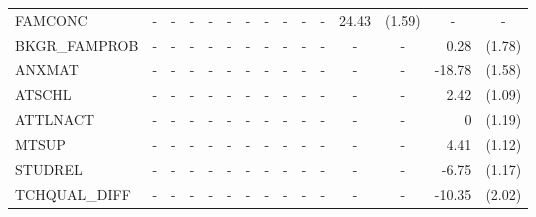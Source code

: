 \documentclass[10pt]{article}
\begin{document}
\begin{table}[htbp]
\begin{tabular}{lrlrlrlrlrlrlrl}
    FAMCONC & \multicolumn{1}{c}{-} & \multicolumn{1}{c}{-} & \multicolumn{1}{c}{-} & \multicolumn{1}{c}{-} & \multicolumn{1}{c}{-} & \multicolumn{1}{c}{-} & \multicolumn{1}{c}{-} & \multicolumn{1}{c}{-} & \multicolumn{1}{c}{-} & \multicolumn{1}{c}{-} & 24.43 & (1.59) & \multicolumn{1}{c}{-} & \multicolumn{1}{c}{-} \\
    BKGR\_FAMPROB & \multicolumn{1}{c}{-} & \multicolumn{1}{c}{-} & \multicolumn{1}{c}{-} & \multicolumn{1}{c}{-} & \multicolumn{1}{c}{-} & \multicolumn{1}{c}{-} & \multicolumn{1}{c}{-} & \multicolumn{1}{c}{-} & \multicolumn{1}{c}{-} & \multicolumn{1}{c}{-} & \multicolumn{1}{c}{-} & \multicolumn{1}{c}{-} & 0.28  & (1.78) \\
    ANXMAT & \multicolumn{1}{c}{-} & \multicolumn{1}{c}{-} & \multicolumn{1}{c}{-} & \multicolumn{1}{c}{-} & \multicolumn{1}{c}{-} & \multicolumn{1}{c}{-} & \multicolumn{1}{c}{-} & \multicolumn{1}{c}{-} & \multicolumn{1}{c}{-} & \multicolumn{1}{c}{-} & \multicolumn{1}{c}{-} & \multicolumn{1}{c}{-} & -18.78 & (1.58) \\
    ATSCHL & \multicolumn{1}{c}{-} & \multicolumn{1}{c}{-} & \multicolumn{1}{c}{-} & \multicolumn{1}{c}{-} & \multicolumn{1}{c}{-} & \multicolumn{1}{c}{-} & \multicolumn{1}{c}{-} & \multicolumn{1}{c}{-} & \multicolumn{1}{c}{-} & \multicolumn{1}{c}{-} & \multicolumn{1}{c}{-} & \multicolumn{1}{c}{-} & 2.42  & (1.09) \\
    ATTLNACT & \multicolumn{1}{c}{-} & \multicolumn{1}{c}{-} & \multicolumn{1}{c}{-} & \multicolumn{1}{c}{-} & \multicolumn{1}{c}{-} & \multicolumn{1}{c}{-} & \multicolumn{1}{c}{-} & \multicolumn{1}{c}{-} & \multicolumn{1}{c}{-} & \multicolumn{1}{c}{-} & \multicolumn{1}{c}{-} & \multicolumn{1}{c}{-} & 0     & (1.19) \\
    MTSUP & \multicolumn{1}{c}{-} & \multicolumn{1}{c}{-} & \multicolumn{1}{c}{-} & \multicolumn{1}{c}{-} & \multicolumn{1}{c}{-} & \multicolumn{1}{c}{-} & \multicolumn{1}{c}{-} & \multicolumn{1}{c}{-} & \multicolumn{1}{c}{-} & \multicolumn{1}{c}{-} & \multicolumn{1}{c}{-} & \multicolumn{1}{c}{-} & 4.41  & (1.12) \\
    STUDREL & \multicolumn{1}{c}{-} & \multicolumn{1}{c}{-} & \multicolumn{1}{c}{-} & \multicolumn{1}{c}{-} & \multicolumn{1}{c}{-} & \multicolumn{1}{c}{-} & \multicolumn{1}{c}{-} & \multicolumn{1}{c}{-} & \multicolumn{1}{c}{-} & \multicolumn{1}{c}{-} & \multicolumn{1}{c}{-} & \multicolumn{1}{c}{-} & -6.75 & (1.17) \\
    TCHQUAL\_DIFF & \multicolumn{1}{c}{-} & \multicolumn{1}{c}{-} & \multicolumn{1}{c}{-} & \multicolumn{1}{c}{-} & \multicolumn{1}{c}{-} & \multicolumn{1}{c}{-} & \multicolumn{1}{c}{-} & \multicolumn{1}{c}{-} & \multicolumn{1}{c}{-} & \multicolumn{1}{c}{-} & \multicolumn{1}{c}{-} & \multicolumn{1}{c}{-} & -10.35 & (2.02) \\

\end{tabular}
\end{table}
\end{document}
